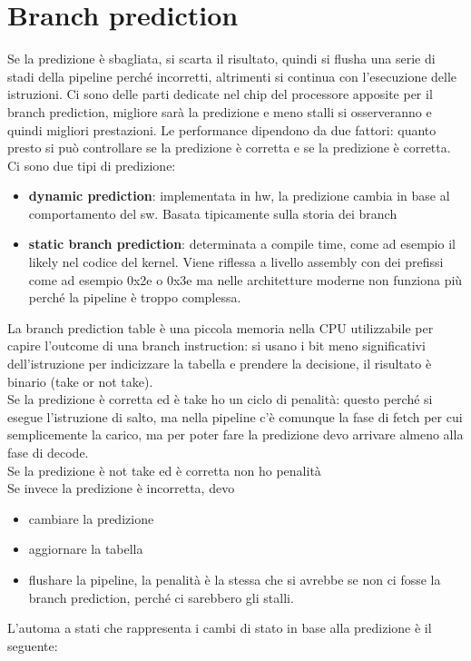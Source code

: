 \documentclass[12pt, oneside]{extbook} %
\begin{document}
\section{Branch prediction}
Se la predizione è sbagliata, si scarta il risultato, quindi si flusha una serie di stadi della pipeline perché incorretti, altrimenti si continua con l'esecuzione delle istruzioni. Ci sono delle parti dedicate nel chip del processore apposite per il branch prediction, migliore sarà la predizione e meno stalli si osserveranno e quindi migliori prestazioni. Le performance dipendono da due fattori: quanto presto si può controllare se la predizione è corretta e se la predizione è corretta.\\ Ci sono due tipi di predizione:
\begin{itemize}
\item \textbf{dynamic prediction}: implementata in hw, la predizione cambia in base al comportamento del sw. Basata tipicamente sulla storia dei branch
\item \textbf{static branch prediction}: determinata a compile time, come ad esempio il \textsf{likely} nel codice del kernel. Viene riflessa a livello assembly con dei prefissi come ad esempio \textsf{0x2e} o \textsf{0x3e} ma nelle architetture moderne non funziona più perché la pipeline è troppo complessa.
\end{itemize}
La branch prediction table è una piccola memoria nella CPU utilizzabile per capire l'outcome di una branch instruction: si usano i bit meno significativi dell'istruzione per indicizzare la tabella e prendere la decisione, il risultato è binario (take or not take). \\ Se la predizione è corretta ed è take ho un ciclo di penalità: questo perché si esegue l'istruzione di salto, ma nella pipeline c'è comunque la fase di fetch per cui semplicemente la carico, ma per poter fare la predizione devo arrivare almeno alla fase di decode.\\ Se la predizione è not take ed è corretta non ho penalità\\ Se invece la predizione è incorretta, devo 
\begin{itemize}
\item cambiare la predizione
\item aggiornare la tabella
\item flushare la pipeline, la penalità è la stessa che si avrebbe se non ci fosse la branch prediction, perché ci sarebbero gli stalli.
\end{itemize}
L'automa a stati che rappresenta i cambi di stato in base alla predizione è il seguente:\\\\
\end{document}
